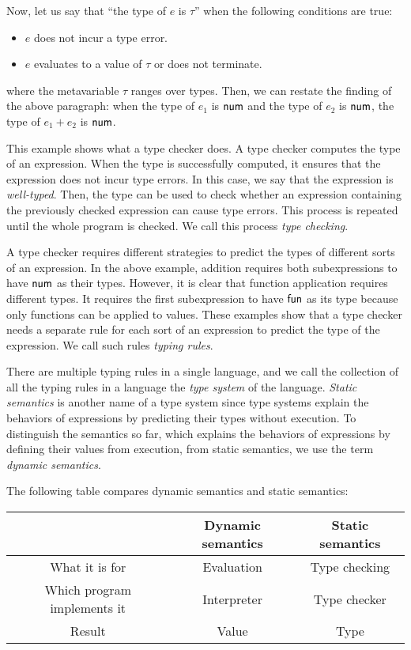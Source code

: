 Now, let us say that ``the type of $e$ is $\tau$'' when the following conditions
are true:
\begin{itemize}
  \item $e$ does not incur a type error.
  \item $e$ evaluates to a value of $\tau$ or does not terminate.
\end{itemize}
where the metavariable $\tau$ ranges over types. Then, we can restate the finding of
the above paragraph: when the type of $e_1$ is $\textsf{num}$ and the type of $e_2$ is
$\textsf{num}$, the type of $e_1+e_2$ is $\textsf{num}$.

This example shows what a type checker does. A type checker computes the type of
an expression. When the type is successfully computed, it ensures that the
expression does not incur type errors. In this case, we say that the expression
is \textit{well-typed}.
Then, the type can be used to check
whether an expression containing the previously checked expression can cause
type errors. This process is repeated until the whole program is checked. We
call this process \textit{type checking}.

A type checker requires different strategies to predict the types of different
sorts of an expression. In the above example, addition requires both
subexpressions to have $\textsf{num}$ as their types. However, it is clear that function
application requires different types. It requires the first subexpression to
have $\textsf{fun}$ as its type because only functions can be applied to values. These
examples show that a type checker needs a separate rule for each sort of an
expression to predict the type of the expression. We call such rules
\textit{typing rules}.

There are multiple typing rules in a
single language, and we call the collection of all the typing rules in a language the
\textit{type system} of the language.
\textit{Static semantics} is another name of a type system since type systems explain the
behaviors of expressions by predicting their types without execution. To
distinguish the semantics so far, which explains the behaviors of expressions by
defining their values from execution, from static semantics, we use the term
\textit{dynamic semantics}.

The following table compares dynamic semantics and static semantics:

\begin{tabular}{@{~}c@{~}||@{~}c@{~}|@{~}c@{~}}
  & Dynamic semantics & Static semantics \\ \hline
  What it is for & Evaluation & Type checking \\
  Which program implements it & Interpreter & Type checker \\
  Result & Value & Type \\
\end{tabular}

